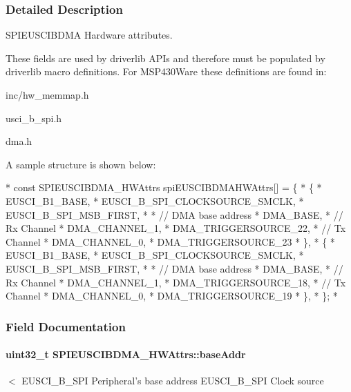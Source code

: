 \subsubsection{Detailed Description}
S\-P\-I\-E\-U\-S\-C\-I\-B\-D\-M\-A Hardware attributes. 

These fields are used by driverlib A\-P\-Is and therefore must be populated by driverlib macro definitions. For M\-S\-P430\-Ware these definitions are found in\-:
\begin{DoxyItemize}
\item inc/hw\-\_\-memmap.\-h
\item usci\-\_\-b\-\_\-spi.\-h
\item dma.\-h
\end{DoxyItemize}

A sample structure is shown below\-: 
\begin{DoxyCode}
*  \textcolor{keyword}{const} SPIEUSCIBDMA_HWAttrs spiEUSCIBDMAHWAttrs[] = \{
*      \{
*          EUSCI\_B1\_BASE,
*          EUSCI\_B\_SPI\_CLOCKSOURCE\_SMCLK,
*          EUSCI\_B\_SPI\_MSB\_FIRST,
*
*          \textcolor{comment}{// DMA base address}
*          DMA\_BASE,
*          \textcolor{comment}{// Rx Channel}
*          DMA\_CHANNEL\_1,
*          DMA\_TRIGGERSOURCE\_22,
*          \textcolor{comment}{// Tx Channel}
*          DMA\_CHANNEL\_0,
*          DMA\_TRIGGERSOURCE\_23
*      \},
*      \{
*          EUSCI\_B1\_BASE,
*          EUSCI\_B\_SPI\_CLOCKSOURCE\_SMCLK,
*          EUSCI\_B\_SPI\_MSB\_FIRST,
*
*          \textcolor{comment}{// DMA base address}
*          DMA\_BASE,
*          \textcolor{comment}{// Rx Channel}
*          DMA\_CHANNEL\_1,
*          DMA\_TRIGGERSOURCE\_18,
*          \textcolor{comment}{// Tx Channel}
*          DMA\_CHANNEL\_0,
*          DMA\_TRIGGERSOURCE\_19
*      \},
*  \};
*  
\end{DoxyCode}
 

\subsubsection{Field Documentation}
\paragraph[{base\-Addr}]{\setlength{\rightskip}{0pt plus 5cm}uint32\-\_\-t S\-P\-I\-E\-U\-S\-C\-I\-B\-D\-M\-A\-\_\-\-H\-W\-Attrs\-::base\-Addr}\label{struct_s_p_i_e_u_s_c_i_b_d_m_a___h_w_attrs_abcb08979f4f6514395d165403a23d100}
$<$ E\-U\-S\-C\-I\-\_\-\-B\-\_\-\-S\-P\-I Peripheral's base address E\-U\-S\-C\-I\-\_\-\-B\-\_\-\-S\-P\-I Clock source 
